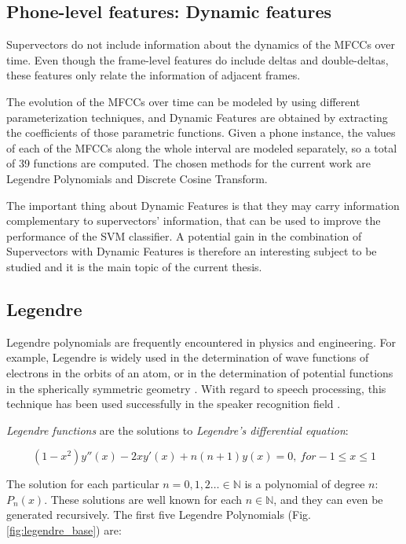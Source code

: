 \subsection{Phone-level features: Dynamic features}

Supervectors do not include information about the dynamics of the MFCCs over time. Even though the frame-level features do include deltas and double-deltas,
these features only relate the information of adjacent frames.

The evolution of the MFCCs over time can be modeled by using different parameterization
techniques,
and Dynamic Features are obtained by extracting the coefficients of those
parametric functions.
Given a phone instance,
the values of each of the MFCCs along the whole interval are
modeled separately, so a total of 39 functions are computed.
The chosen methods for the current work are Legendre Polynomials and Discrete Cosine Transform.

The important thing about Dynamic Features is that they
may carry information complementary to supervectors' information, that can be used to improve
the performance of the SVM classifier. A potential gain in the combination
of Supervectors with Dynamic Features is therefore an interesting
subject to be studied and it is the main topic of the current thesis.

\subsection{Legendre}

Legendre polynomials are frequently encountered in physics and engineering.
For example, Legendre is widely used in the determination of wave
functions of electrons in the orbits of an atom, or in the determination of potential
functions in the spherically symmetric geometry \cite{legendre_usage}.
With regard to speech processing,
this technique has been used successfully
in the speaker recognition field \cite{legendre}.

\textit{Legendre functions} are the solutions to \textit{Legendre's differential equation}:

\begin{equation}
(1-x^{2})y''(x)-2xy'(x)+n(n+1)y(x)=0, \ for -1 \leq x \leq 1
\end{equation}

The solution for each particular $n={0, 1, 2 \dotsc} \in \mathbb{N}$ is a polynomial of degree
$n$: $P_{n}(x)$. These solutions are well known for each $n \in \mathbb{N}$, and they can even
be generated recursively. The first five Legendre Polynomials (Fig. \ref{fig:legendre_base}) are:


